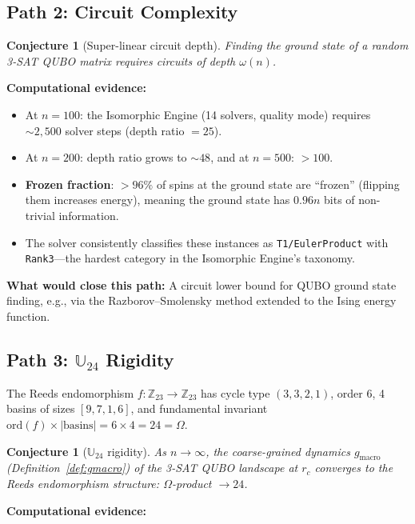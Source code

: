 \documentclass[11pt,a4paper]{article}
\theoremstyle{plain}
\newtheorem{conjecture}[theorem]{Conjecture}
\theoremstyle{definition}
\theoremstyle{remark}
\begin{document}
\subsection{Path 2: Circuit Complexity}

\begin{conjecture}[Super-linear circuit depth]
Finding the ground state of a random 3-SAT QUBO matrix requires circuits of depth $\omega(n)$.
\end{conjecture}

\textbf{Computational evidence:}
\begin{itemize}
\item At $n = 100$: the Isomorphic Engine (14 solvers, quality mode) requires $\sim 2{,}500$ solver steps (depth ratio $= 25$).
\item At $n = 200$: depth ratio grows to $\sim 48$, and at $n = 500$: $> 100$.
\item \textbf{Frozen fraction}: $> 96\%$ of spins at the ground state are ``frozen'' (flipping them increases energy), meaning the ground state has $0.96n$ bits of non-trivial information.
\item The solver consistently classifies these instances as \texttt{T1/EulerProduct} with \texttt{Rank3}---the hardest category in the Isomorphic Engine's taxonomy.
\end{itemize}

\textbf{What would close this path:} A circuit lower bound for QUBO ground state finding, e.g., via the Razborov--Smolensky method extended to the Ising energy function.

\subsection{Path 3: $\mathbb{U}_{24}$ Rigidity}

The Reeds endomorphism $f: \mathbb{Z}_{23} \to \mathbb{Z}_{23}$ \cite{DWR2026} has cycle type $(3,3,2,1)$, order 6, 4 basins of sizes $[9,7,1,6]$, and fundamental invariant $\text{ord}(f) \times |\text{basins}| = 6 \times 4 = 24 = \Omega$.

\begin{conjecture}[$\mathbb{U}_{24}$ rigidity]\label{conj:rigidity}
As $n \to \infty$, the coarse-grained dynamics $g_{\text{macro}}$ (Definition~\ref{def:gmacro}) of the 3-SAT QUBO landscape at $r_c$ converges to the Reeds endomorphism structure: $\Omega$-product $\to 24$.
\end{conjecture}

\textbf{Computational evidence:}
\end{document}
